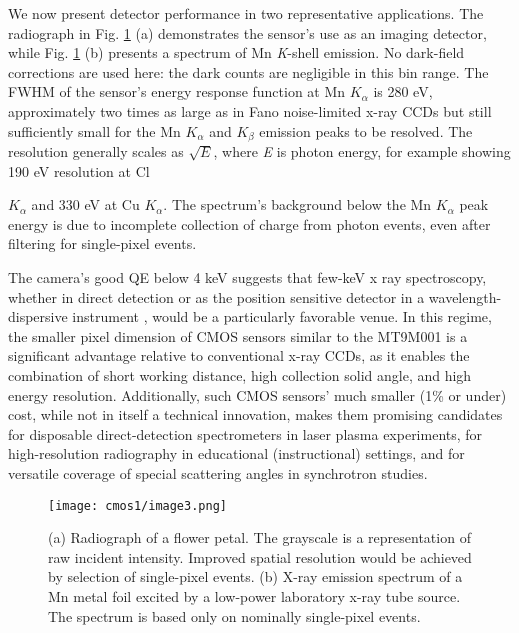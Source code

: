 We now present detector performance in two representative applications.
The radiograph in Fig. \ref{cm1image3} (a) demonstrates the sensor's use as an imaging
detector, while Fig. \ref{cm1image3} (b) presents a spectrum of Mn \emph{K}-shell
emission. No dark-field corrections are used here: the dark counts are
negligible in this bin range. The FWHM of the sensor's energy response
function at Mn \(K_{\alpha}\) is 280 eV, approximately two times as
large as in Fano noise-limited x-ray CCDs but still sufficiently small
for the Mn \(K_{\alpha}\) and \(K_{\beta}\) emission peaks to be
resolved. The resolution generally scales as \(\sqrt{E}\), where
\emph{E} is photon energy, for example showing 190 eV resolution at Cl
\(K_{\alpha}\)
and 330 eV at Cu \(K_{\alpha}\). The spectrum's background below the Mn
\(K_{\alpha}\) peak energy is due to incomplete collection of charge
from photon events, even after filtering for single-pixel events.

The camera's good QE below 4 keV suggests that few-keV x ray
spectroscopy, whether in direct detection or as the position sensitive
detector in a wavelength-dispersive
instrument \cite{HUOTARI2005IMPROVING}, would be a
particularly favorable venue. In this regime, the smaller pixel
dimension of CMOS sensors similar to the MT9M001 is a significant
advantage relative to conventional x-ray CCDs, as it enables the
combination of short working distance, high collection solid angle, and
high energy
resolution.
 \cite{PACOLD2012MINIATURE, MATTERN2012PLASTIC, DICKINSON2008SHORT} Additionally, such
CMOS sensors' much smaller (1\% or under) cost, while not in itself a
technical innovation, makes them promising candidates for disposable
direct-detection spectrometers in laser plasma experiments, for
high-resolution radiography in educational (instructional) settings,
and for versatile coverage of special scattering angles in synchrotron
studies.

\begin{figure}[h] \label{cm1image3}
\caption{ (a) Radiograph of a flower petal. The grayscale is a
representation of raw incident intensity. Improved spatial resolution
would be achieved by selection of single-pixel
events. (b) X-ray
emission spectrum of a Mn metal foil excited by a low-power laboratory
x-ray tube source. The spectrum is based only on nominally single-pixel
events.}
\centering
\texttt{[image: cmos1/image3.png]}
\end{figure}


